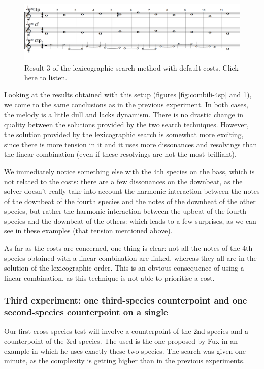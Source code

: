 \begin{figure}[h]
    \centering
    \includegraphics[width=1\textwidth]{Images/Experiments/basic-lexico-4sp.png}
    \caption{Result 3 of the lexicographic search method with default costs. Click \href{https://youtu.be/msY1LOGw3v8}{here} to listen.}
    \label{fig:lexico-4sp}
\end{figure}
Looking at the results obtained with this setup (figures \ref{fig:combili-4sp} and \ref{fig:lexico-4sp}), we come to the same conclusions as in the previous experiment. 
In both cases, the melody is a little dull and lacks dynamism. There is no drastic change in quality between the solutions provided by the two search techniques. However, the solution provided by the lexicographic search is somewhat more exciting, since there is more tension in it and it uses more dissonances and resolvings than the linear combination (even if these resolvings are not the most brilliant).

We immediately notice something else with the 4th species on the bass, which is not related to the costs: there are a few dissonances on the downbeat, as the solver doesn't really take into account the harmonic interaction between the notes of the downbeat of the fourth species and the notes of the downbeat of the other species, but rather the harmonic interaction between the upbeat of the fourth species and the downbeat of the others: which leads to a few surprises, as we can see in these examples (that tension mentioned above).

As far as the costs are concerned, one thing is clear: not all the notes of the 4th species obtained with a linear combination are linked, whereas they all are in the solution of the lexicographic order. This is an obvious consequence of using a linear combination, as this technique is not able to prioritise a cost.


\subsubsection{Third experiment: one third-species counterpoint and one second-species counterpoint on a single \cf}
Our first cross-species test will involve a counterpoint of the 2nd species and a counterpoint of the 3rd species. The \cfs used is the one proposed by Fux in an example in which he uses exactly these two species. The search was given one minute, as the complexity is getting higher than in the previous experiments. \label{subsection:third-experiment-with-costs}


